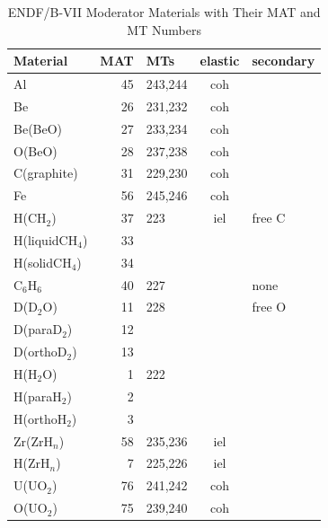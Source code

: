 \begin{table}[b]
\caption[ENDF/B-VII Thermal Data Files]{ENDF/B-VII Moderator Materials
with Their MAT and MT Numbers}
\label{th2}
\begin{center}
\begin{tabular}{lrlcl}
   Material         &  MAT  &  MTs   & elastic & secondary \\ \hline
   Al               &  45   &  243,244  &  coh  &          \\
   Be               &  26   &  231,232  &  coh  &          \\
   Be(BeO)          &  27   &  233,234  &  coh  &          \\
   O(BeO)           &  28   &  237,238  &  coh  &          \\
   C(graphite)      &  31   &  229,230  &  coh  &          \\
   Fe               &  56   &  245,246  &  coh  &          \\
   H(CH$_2$)           &  37   &  223      &  iel  & free C   \\
   H(liquidCH$_4$)     &  33   &           &       &          \\
   H(solidCH$_4$)      &  34   &           &       &          \\
   C$_6$H$_6$             &  40   &  227      &       & none     \\
   D(D$_2$O)           &  11   &  228      &       & free O   \\
   D(paraD$_2$)        &  12   &           &       &          \\
   D(orthoD$_2$)       &  13   &           &       &          \\
   H(H$_2$O)           &   1   &  222      &       &          \\
   H(paraH$_2$)        &   2   &           &       &          \\
   H(orthoH$_2$)       &   3   &           &       &          \\
   Zr(ZrH$_n$)         &  58   &  235,236  &  iel  &          \\
   H(ZrH$_n$)          &   7   &  225,226  &  iel  &          \\
   U(UO$_2$)           &  76   &  241,242  &  coh  &          \\
   O(UO$_2$)           &  75   &  239,240  &  coh  &          \\
  \hline
\end{tabular}
\end{center}
\end{table}

